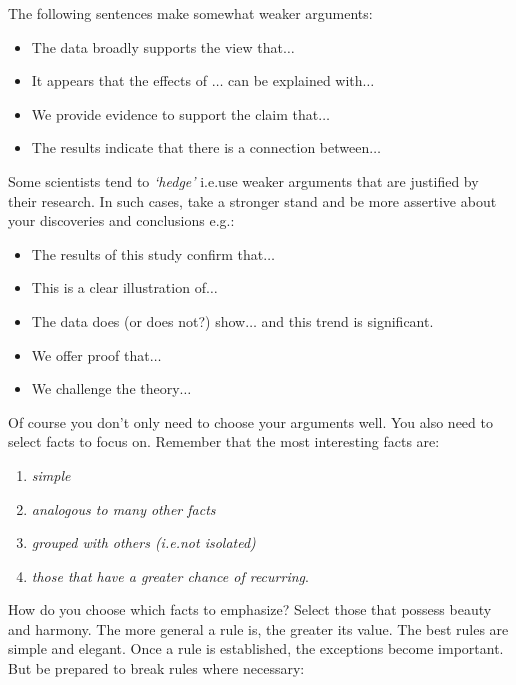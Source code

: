 \documentclass[graybox,envcountchap,sectrefs,UStrade]{svmono}
\begin{document}
The following sentences make somewhat weaker arguments:

\begin{itemize}
  \item The data broadly supports the view that$\ldots$
  \item It appears that the effects of $\ldots$ can be explained with$\ldots$
  \item We provide evidence to support the claim that$\ldots$
  \item The results indicate that there is a connection between$\ldots$
\end{itemize}

Some scientists tend to \emph{`hedge'} i.e.\@ use weaker arguments that are justified by their research. In such cases, take a stronger stand and be more assertive about your discoveries and conclusions e.g.:

\begin{itemize}
  \item The results of this study confirm that$\ldots$
  \item This is a clear illustration of$\ldots$
  \item The data does (or does not?) show$\ldots$ and this trend is significant.
  \item We offer proof that$\ldots$
  \item We challenge the theory$\ldots$
\end{itemize}

Of course you don't only need to choose your arguments well. You also need to select facts to focus on. Remember that the most interesting facts are:

\begin{enumerate}
  \item \emph{simple}
  \item \emph{analogous to many other facts}
  \item \emph{grouped with others (i.e.\@ not isolated)}
  \item \emph{those that have a greater chance of recurring}.
\end{enumerate}

How do you choose which facts to emphasize? Select those that possess beauty and harmony. The more general a rule is, the greater its value. The best rules are simple and elegant. Once a rule is established, the exceptions become important. But be prepared to break rules where necessary:\par
\end{document}
